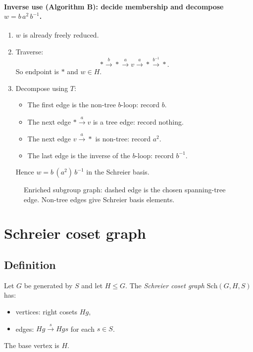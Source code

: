 \documentclass[11pt]{article}
\theoremstyle{definition}
\theoremstyle{plain}
\theoremstyle{remark}
\newcommand{\Sch}{\mathrm{Sch}}
\begin{document}
\paragraph{Inverse use (Algorithm B): decide membership and decompose $w=b\,a^2\,b^{-1}$.}
\begin{enumerate}[leftmargin=2.2em]
\item $w$ is already freely reduced.
\item Traverse:
\[
*\xrightarrow{b}*\xrightarrow{a}v\xrightarrow{a}*\xrightarrow{b^{-1}}*.
\]
So endpoint is $*$ and $w\in H$.
\item Decompose using $T$:
\begin{itemize}[leftmargin=2em]
\item The first edge is the non-tree $b$-loop: record $b$.
\item The next edge $*\xrightarrow{a}v$ is a tree edge: record nothing.
\item The next edge $v\xrightarrow{a}*$ is non-tree: record $a^2$.
\item The last edge is the inverse of the $b$-loop: record $b^{-1}$.
\end{itemize}
Hence $w=b\,(a^2)\,b^{-1}$ in the Schreier basis.
\end{enumerate}

\begin{figure}[h]
\centering
{}
\caption{Enriched subgroup graph: dashed edge is the chosen spanning-tree edge. Non-tree edges give Schreier basis elements.}
\end{figure}

\clearpage
\section{Schreier coset graph}

\subsection*{Definition}
Let $G$ be generated by $S$ and let $H\le G$.
The \emph{Schreier coset graph} $\Sch(G,H,S)$ has:
\begin{itemize}[leftmargin=2em]
\item vertices: right cosets $Hg$,
\item edges: $Hg\xrightarrow{s}Hgs$ for each $s\in S$.
\end{itemize}
The base vertex is $H$.\cite{schreier1927,serre1980trees}
\end{document}
